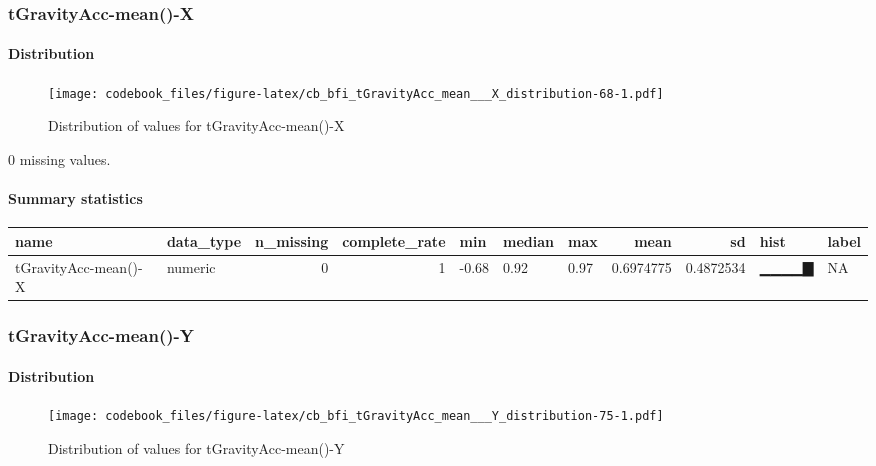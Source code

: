 \documentclass[
]{article}
\begin{document}
\hypertarget{tGravityAcc_mean___X}{%
\subsubsection{tGravityAcc-mean()-X}\label{tGravityAcc_mean___X}}

\hypertarget{tGravityAcc_mean___X_distribution}{%
\paragraph{Distribution}\label{tGravityAcc_mean___X_distribution}}

\begin{figure}
\centering
\texttt{[image: codebook\_files/figure-latex/cb\_bfi\_tGravityAcc\_mean\_\_\_X\_distribution-68-1.pdf]}
\caption{Distribution of values for tGravityAcc-mean()-X}
\end{figure}

0 missing values.

\hypertarget{tGravityAcc_mean___X_summary}{%
\paragraph{Summary statistics}\label{tGravityAcc_mean___X_summary}}

\begin{longtable}[]{@{}llrrlllrrll@{}}
\toprule
name & data\_type & n\_missing & complete\_rate & min & median & max &
mean & sd & hist & label \\
\midrule
\endhead
tGravityAcc-mean()-X & numeric & 0 & 1 & -0.68 & 0.92 & 0.97 & 0.6974775
& 0.4872534 & ▁▁▁▁▇ & NA \\
\bottomrule
\end{longtable}

\hypertarget{tGravityAcc_mean___Y}{%
\subsubsection{tGravityAcc-mean()-Y}\label{tGravityAcc_mean___Y}}

\hypertarget{tGravityAcc_mean___Y_distribution}{%
\paragraph{Distribution}\label{tGravityAcc_mean___Y_distribution}}

\begin{figure}
\centering
\texttt{[image: codebook\_files/figure-latex/cb\_bfi\_tGravityAcc\_mean\_\_\_Y\_distribution-75-1.pdf]}
\caption{Distribution of values for tGravityAcc-mean()-Y}
\end{figure}
\end{document}
